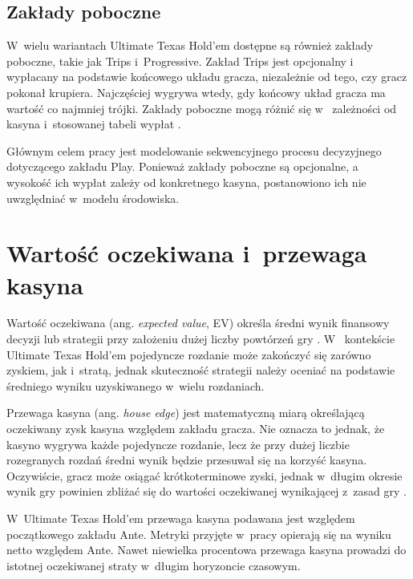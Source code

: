 \subsection{Zakłady poboczne}

W~wielu wariantach Ultimate Texas Hold’em dostępne są również zakłady
poboczne, takie jak Trips i~Progressive. Zakład Trips jest opcjonalny i~
wypłacany na podstawie końcowego układu gracza, niezależnie od tego, czy
gracz pokonał krupiera. Najczęściej wygrywa wtedy, gdy końcowy układ
gracza ma wartość co najmniej trójki. Zakłady poboczne mogą różnić się w~
zależności od kasyna i~stosowanej tabeli wypłat \cite{tulalip_uth_rules}.

Głównym celem pracy jest modelowanie sekwencyjnego procesu decyzyjnego
dotyczącego zakładu Play. Ponieważ zakłady poboczne są opcjonalne, a~
wysokość ich wypłat zależy od konkretnego kasyna, postanowiono ich
nie uwzględniać w~modelu środowiska.

\section{Wartość oczekiwana i~przewaga kasyna}

Wartość oczekiwana (ang. \emph{expected value}, EV) określa średni wynik
finansowy decyzji lub strategii przy założeniu dużej liczby powtórzeń gry
\cite{packel_games_gambling_2006}. W~
kontekście Ultimate Texas Hold’em pojedyncze rozdanie może zakończyć się
zarówno zyskiem, jak i~stratą, jednak skuteczność strategii należy oceniać na
podstawie średniego wyniku uzyskiwanego w~wielu rozdaniach.

Przewaga kasyna (ang. \emph{house edge}) jest matematyczną miarą określającą
oczekiwany zysk kasyna względem zakładu gracza. Nie oznacza to jednak, że kasyno
wygrywa każde pojedyncze rozdanie, lecz że przy dużej liczbie rozegranych
rozdań średni wynik będzie przesuwał się na korzyść kasyna. Oczywiście, gracz może
osiągać krótkoterminowe zyski, jednak w~długim okresie wynik gry powinien
zbliżać się do wartości oczekiwanej wynikającej z~zasad gry
\cite{investopedia_house_edge}.


W~Ultimate Texas Hold’em przewaga kasyna podawana jest względem
początkowego zakładu Ante. Metryki przyjęte w~pracy opierają się na
wyniku netto względem Ante. Nawet niewielka procentowa przewaga kasyna
prowadzi do istotnej oczekiwanej straty w~długim horyzoncie czasowym.

